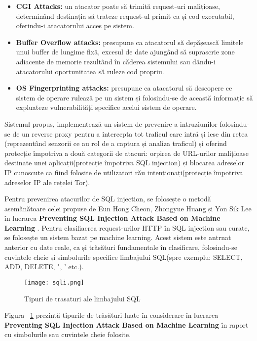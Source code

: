 \begin{itemize}
	\item \textbf{CGI Attacks:}  un atacator poate să trimită request-uri malițioase, determinând destinația să trateze request-ul primit ca și cod executabil, oferindu-i atacatorului acces pe sistem. 
	\item \textbf{Buffer Overflow attacks:}  presupune ca atacatorul să depășească limitele unui buffer de lungime fixă, excesul de date ajungând să suprascrie zone adiacente de memorie rezultând în căderea sistemului sau dându-i atacatorului oportunitatea să ruleze cod propriu. 
	\item \textbf{OS Fingerprinting attacks:}  presupune ca atacatorul să descopere ce sistem de operare rulează pe un sistem și folosindu-se de această informație să expluateze vulnerabilități specifice acelui sistem de operare. 
\end{itemize}

Sistemul propus, \textit{\thesistitle}  implementează un sistem de prevenire a intruziunilor folosindu-se de un reverse proxy pentru a intercepta tot traficul care intră și iese din rețea (reprezentând senzorii ce au rol de a captura și analiza traficul) și oferind protecție împotriva a două categorii de atacuri: orpirea de URL-urilor malițioase destinate unei aplicații(protecție împotriva SQL injection) și blocarea adreselor IP cunoscute ca fiind folosite de utilizatori rău intenționați(protecție împotriva adreselor IP ale rețelei Tor). 

Pentru prevenirea atacurilor de SQL injection, se folosește o metodă asemănătoare celei propuse de Eun Hong Cheon, Zhongyue Huang și Yon Sik Lee în lucrarea  \textbf{Preventing SQL Injection Attack Based on Machine Learning} \cite{sqli_how}. Pentru clasifiacrea request-urilor HTTP în SQL injection sau curate, se folosește un sistem bazat pe machine learning. Acest sistem este antrnat anterior cu date reale, ca și trăsături fundamentale în clasificare, folosindu-se cuvintele cheie și simbolurile specifice limbajului SQL(spre exemplu: SELECT, ADD, DELETE, ", ' etc.). 

\begin{figure}[h]
\centering
\texttt{[image: sqli.png]}
\caption{Tipuri de trasaturi ale limbajului SQL}
\label{fig:sql-features}
\end{figure}

Figura ~\ref{fig:sql-features}  prezintă tipurile de trăsături luate în considerare în lucrarea \textbf{Preventing SQL Injection Attack Based on Machine Learning} în raport cu simbolurile sau cuvintele cheie folosite.  


